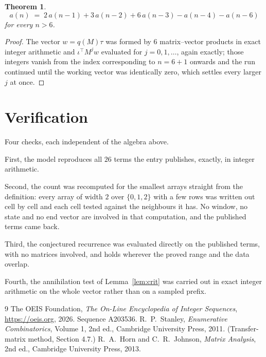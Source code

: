 \documentclass[11pt,a4paper]{article}
\theoremstyle{plain}
\newtheorem{theorem}{Theorem}
\theoremstyle{definition}
\begin{document}
\begin{theorem}
\[
a(n)\;=\;2\,a(n-1) + 3\,a(n-2) + 6\,a(n-3) - a(n-4) - a(n-6)
\]
for every $n>6$.
\end{theorem}

\begin{proof}
The vector $w=q(M)\tau$ was formed by $6$ matrix--vector products in exact integer
arithmetic and $\iota^{\!\top}M^{j}w$ evaluated for $j=0,1,\dots$, again exactly; those
integers vanish from the index corresponding to $n=6+1$ onwards and the run continued
until the working vector was identically zero, which settles every larger $j$ at once.
\end{proof}

\section{Verification}

Four checks, each independent of the algebra above.

First, the model reproduces all $26$ terms the entry publishes, exactly, in integer
arithmetic.

Second, the count was recomputed for the smallest arrays straight from the definition: every
array of width $2$ over $\{0,1,2\}$ with a few rows was written out cell by cell and each cell
tested against the neighbours it has. No window, no state and no end vector are involved in that
computation, and the published terms came back.

Third, the conjectured recurrence was evaluated directly on the published terms, with no
matrices involved, and holds wherever the proved range and the data overlap.

Fourth, the annihilation test of Lemma~\ref{lem:crit} was carried out in exact integer
arithmetic on the whole vector rather than on a sampled prefix.

\begin{thebibliography}{9}
 The OEIS Foundation, \emph{The On-Line Encyclopedia of Integer
Sequences}, \url{https://oeis.org}, 2026. Sequence A203536.
 R.~P.~Stanley, \emph{Enumerative Combinatorics}, Volume 1, 2nd ed.,
Cambridge University Press, 2011. (Transfer-matrix method, Section 4.7.)
 R.~A.~Horn and C.~R.~Johnson, \emph{Matrix Analysis}, 2nd ed., Cambridge
University Press, 2013.
\end{thebibliography}
\end{document}
